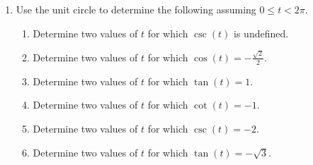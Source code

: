 \begin{enumerate}
  \begin{enumerate}[itemsep=2em]
  \end{enumerate}

\clearpage

\item Use the unit circle to determine the following assuming
  $0\leq t < 2\pi$.
\begin{enumerate}


\item Determine two values of $t$ for which $\csc(t)$ is undefined.
\vfill

\item Determine two values of $t$ for which $\cos(t)=-\frac{\sqrt{2}}{2}$.
\vfill

\item Determine two values of $t$ for which $\tan(t)=1$.
\vfill

\item Determine two values of $t$ for which $\cot(t)=-1$.
\vfill

\item Determine two values of $t$ for which $\csc(t)=-2$.
\vfill

\item Determine two values of $t$ for which $\tan(t)=-\sqrt{3}$.
\vfill

\end{enumerate}


\end{enumerate}

